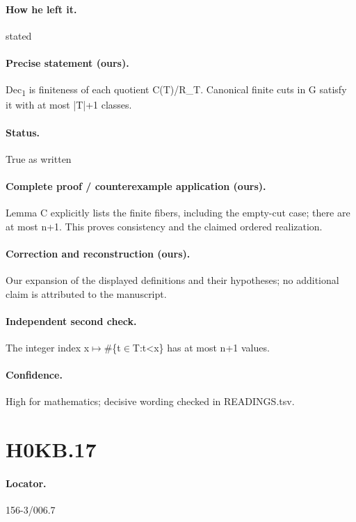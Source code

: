 \paragraph{How he left it.} stated

\paragraph{Precise statement (ours).} Dec\textsubscript{1} is finiteness of each quotient C(T)/R\_T. Canonical finite cuts in G satisfy it with at most |T|+1 classes.

\paragraph{Status.} True as written

\paragraph{Complete proof / counterexample application (ours).} Lemma C explicitly lists the finite fibers, including the empty-cut case; there are at most n+1. This proves consistency and the claimed ordered realization.

\paragraph{Correction and reconstruction (ours).} Our expansion of the displayed definitions and their hypotheses; no additional claim is attributed to the manuscript.

\paragraph{Independent second check.} The integer index x\ensuremath{\mapsto}\#\{t\ensuremath{\in}T:t<x\} has at most n+1 values.

\paragraph{Confidence.} High for mathematics; decisive wording checked in READINGS.tsv.

\section*{H0KB.17}\label{statement:H0KB.17}
\paragraph{Locator.} 156-3/006.7

